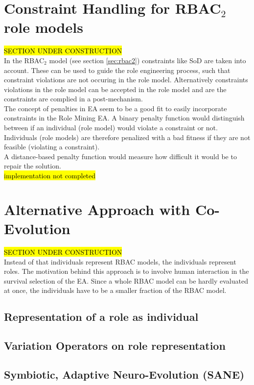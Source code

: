     \section{Constraint Handling for RBAC$_2$ role models}
    \hl{SECTION UNDER CONSTRUCTION}\\
    In the RBAC$_2$ model (see section \ref{sec:rbac2}) constraints like SoD are taken into account. These can be used to guide the role engineering process, such that constraint violations are not occuring in the role model. Alternatively constraints violations in the role model can be accepted in the role model and are the constraints are complied in a post-mechanism.\\
    The concept of penalties in EA seem to be a good fit to easily incorporate constraints in the Role Mining EA. A binary penalty function would distinguish between if an individual (role model) would violate a constraint or not. Individuals (role models) are therefore penalized with a bad fitness if they are not feasible (violating a constraint).\\
    A distance-based penalty function would measure how difficult it would be to repair the solution.\\
    \hl{implementation not completed}
        
    \section{Alternative Approach with Co-Evolution}
    \hl{SECTION UNDER CONSTRUCTION}\\
    Instead of that individuals represent RBAC models, the individuals represent roles. The motivation behind this approach is to involve human interaction in the survival selection of the EA. Since a whole RBAC model can be hardly evaluated at once, the individuals have to be a smaller fraction of the RBAC model.
        \subsection{Representation of a role as individual}
        \subsection{Variation Operators on role representation}
        \subsection{Symbiotic, Adaptive Neuro-Evolution (SANE)}
